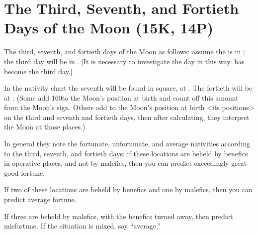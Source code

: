 \section{The Third, Seventh, and Fortieth Days of the Moon (15K, 14P)}

The third, seventh, and fortieth days of the Moon as follows: assume the \Moon\xspace is in \deg; the third day will be in \Sagittarius\xspace 7\deg. [It is necessary to investigate the day in this way. \Sagittarius\xspace 7\deg\xspace has
become the third day.] 

In the nativity chart the seventh will be found in square, at \Aquarius\xspace 7\deg. The fortieth will be at \Taurus\xspace 7\deg. (Some add 160\deg to the Moon’s position at birth and count off this amount from the Moon’s sign. Others add to the Moon’s position at birth <its positions> on the third and seventh
and fortieth days, then after calculating, they interpret the Moon at those places.)

\mndl[0.2cm]
In general they note the fortunate, unfortunate, and average nativities according to the third, seventh, and fortieth days: if these locations are beheld by benefics in operative places, and not by malefics, then you can predict exceedingly great good fortune. 

If two of these locations are beheld by benefics and one by malefics, then you can predict average fortune. 

If three are beheld by malefics, with the benefics turned
away, then predict misfortune. If the situation is mixed, say “average.”

\newpage